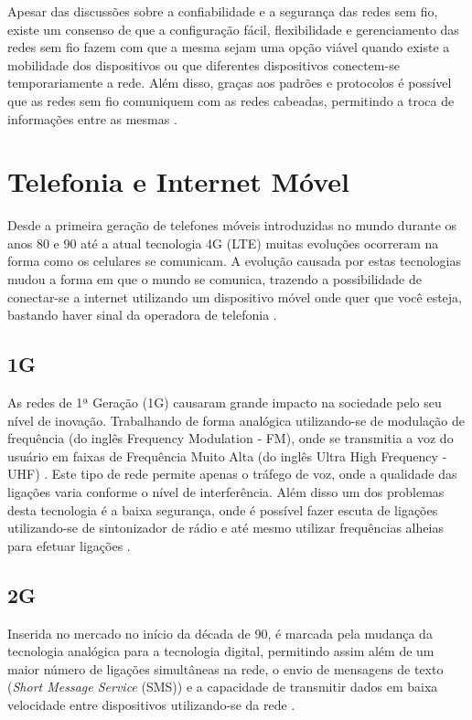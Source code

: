 Apesar das discussões sobre a confiabilidade e a segurança das redes sem fio, existe um consenso de que a configuração fácil, flexibilidade e gerenciamento das redes sem fio fazem com que a mesma sejam uma opção viável quando existe a mobilidade dos dispositivos ou que diferentes dispositivos conectem-se temporariamente a rede. Além disso, graças aos padrões e protocolos é possível que as redes sem fio comuniquem com as redes cabeadas, permitindo a troca de informações entre as mesmas \cite{RedesSemFioUFLA}.

\section{Telefonia e Internet Móvel}
Desde a primeira geração de telefones móveis introduzidas no mundo durante os anos 80 e 90  até a atual tecnologia 4G (LTE) muitas evoluções ocorreram na forma como os celulares se comunicam. A evolução causada por estas tecnologias mudou a forma em que o mundo se comunica, trazendo a possibilidade de conectar-se a internet utilizando um dispositivo móvel onde quer que você esteja, bastando haver sinal da operadora de telefonia \cite{GeracoesTelefoniaMovel}.

\subsection{1G}
As redes de 1ª Geração (1G) causaram grande impacto na sociedade pelo seu nível de inovação. Trabalhando de forma analógica utilizando-se de modulação de frequência (do inglês Frequency Modulation - FM), onde se transmitia a voz do usuário em faixas de Frequência Muito Alta (do inglês Ultra High Frequency - UHF) \cite{AEvolucaoTelefoniaCelular}. Este tipo de rede permite apenas o tráfego de voz, onde a qualidade das ligações varia conforme o nível de interferência. Além disso um dos problemas desta tecnologia é a baixa segurança, onde é possível fazer escuta de ligações utilizando-se de sintonizador de rádio e até mesmo utilizar frequências alheias para efetuar ligações  \cite{GeracoesTelefoniaMovel}.

\subsection{2G}
Inserida no mercado no início da década de 90, é marcada pela mudança da tecnologia analógica para a tecnologia digital, permitindo assim além de um maior número de ligações simultâneas na rede, o envio de mensagens de texto (\emph{Short Message Service} (SMS)) e a capacidade de transmitir dados em baixa velocidade entre dispositivos utilizando-se da rede \cite{GeracoesTelefoniaMovel}.


